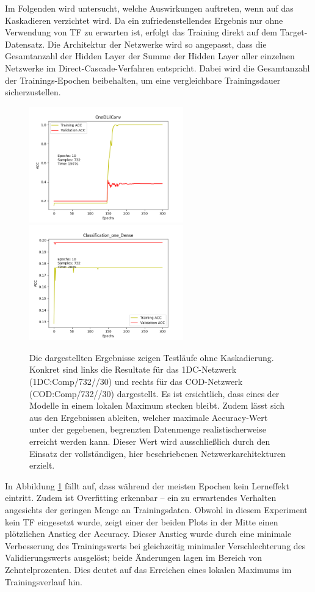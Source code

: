 Im Folgenden wird untersucht, welche Auswirkungen auftreten, wenn auf das Kaskadieren verzichtet wird. Da ein zufriedenstellendes Ergebnis 
nur ohne Verwendung von TF zu erwarten ist, erfolgt das Training direkt auf dem Target-Datensatz. Die Architektur der 
Netzwerke wird so angepasst, dass die Gesamtanzahl der Hidden Layer der Summe der Hidden Layer aller einzelnen Netzwerke im 
Direct-Cascade-Verfahren entspricht. Dabei wird die Gesamtanzahl der Trainings-Epochen beibehalten, um eine vergleichbare Trainingsdauer 
sicherzustellen.

\begin{figure}[htpb]
    \includegraphics[height=5cm]{../../Plots/ba_plots/classnocascade/1dc.png}
    \includegraphics[height=5cm]{../../Plots/ba_plots/classnocascade/cod.png}
    \caption{\label{fig:nocascade} 
    \small{Die dargestellten Ergebnisse zeigen Testläufe ohne Kaskadierung. Konkret sind links die Resultate für das 1DC-Netzwerk (1DC:Comp/732//30) 
    und rechts für das COD-Netzwerk (COD:Comp/732//30) dargestellt. Es ist ersichtlich, dass eines der Modelle in einem lokalen Maximum stecken bleibt. 
    Zudem lässt sich aus den Ergebnissen ableiten, welcher maximale Accuracy-Wert unter der gegebenen, begrenzten Datenmenge realistischerweise 
    erreicht werden kann. Dieser Wert wird ausschließlich durch den Einsatz der vollständigen, hier beschriebenen Netzwerkarchitekturen erzielt.}}
\end{figure}

In Abbildung \ref{fig:nocascade} fällt auf, dass während der meisten Epochen kein Lerneffekt eintritt. Zudem ist Overfitting 
erkennbar – ein zu erwartendes Verhalten angesichts der geringen Menge an Trainingsdaten. Obwohl in diesem Experiment kein TF eingesetzt wurde, 
zeigt einer der beiden Plots in der Mitte einen plötzlichen Anstieg der Accuracy. Dieser Anstieg wurde durch eine minimale Verbesserung des 
Trainingswerts bei gleichzeitig minimaler Verschlechterung des Validierungswerts ausgelöst; beide Änderungen lagen im Bereich von 
Zehntelprozenten. Dies deutet auf das Erreichen eines lokalen Maximums im Trainingsverlauf hin.

